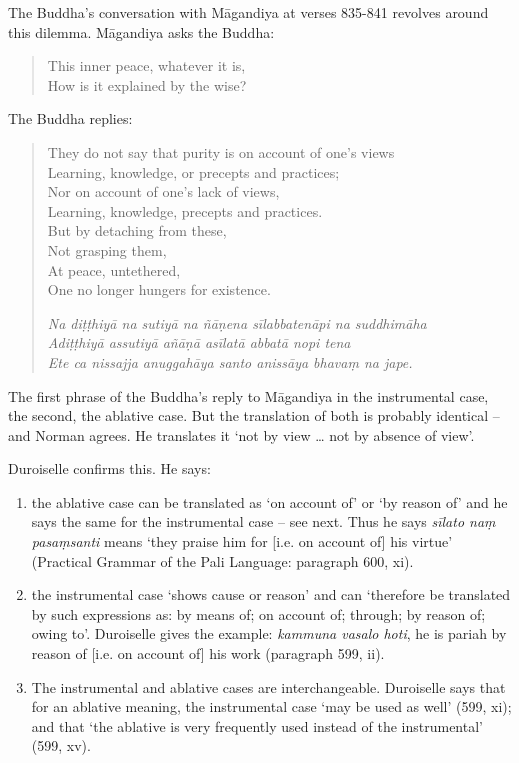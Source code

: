 The Buddha's conversation with M\=agandiya at verses 835-841 revolves around this dilemma. M\=agandiya asks the Buddha: 

\begin{verse}
This inner peace, whatever it is,\\
How is it explained by the wise?
\end{verse}

The Buddha replies:

\begin{verse}
They do not say that purity is on account of one's views\\
Learning, knowledge, or precepts and practices;\\
Nor on account of one's lack of views,\\
Learning, knowledge, precepts and practices.\\
But by detaching from these,\\
Not grasping them,\\
At peace, untethered,\\
One no longer hungers for existence.

\textit{Na diṭṭhiyā na sutiyā na ñāṇena sīlabbatenāpi na suddhimāha\\
Adiṭṭhiyā assutiyā añāṇā asīlatā abbatā nopi tena\\
Ete ca nissajja anuggahāya santo anissāya bhavaṃ na jape.}
\end{verse}

The first phrase of the Buddha's reply to Māgandiya in the instrumental case, the second, the ablative case. But the translation of both is probably identical -- and Norman agrees. He translates it `not by view \ldots{} not by absence of view'.

Duroiselle confirms this. He says:

\begin{enumerate}

\item the ablative case can be translated as `on account of' or `by reason of' and he says the same for the instrumental case -- see next. Thus he says \textit{sīlato naṃ pasaṃsanti} means `they praise him for [i.e. on account of] his virtue' (Practical Grammar of the Pali Language: paragraph 600, xi).

\item the instrumental case `shows cause or reason' and can `therefore be translated by such expressions as: by means of; on account of; through; by reason of; owing to'. Duroiselle gives the example: \textit{kammuna vasalo hoti}, he is pariah by reason of [i.e. on account of] his work (paragraph 599, ii).

\item The instrumental and ablative cases are interchangeable. Duroiselle says that for an ablative meaning, the instrumental case `may be used as well' (599, xi); and that `the ablative is very frequently used instead of the instrumental' (599, xv).

\end{enumerate}

